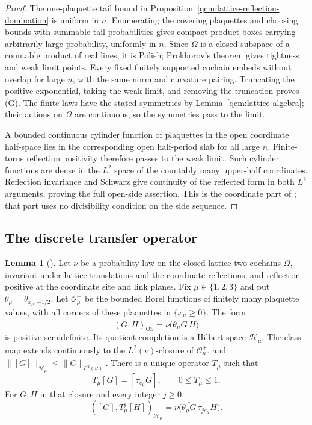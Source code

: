 \documentclass[11pt,letterpaper,reqno]{amsart}
\theoremstyle{definition}
\newtheorem{qcmlemma}[qcmproposition]{Lemma}
\newenvironment{lemma}[1][]{\pushQED{\qed}\renewcommand{\qedsymbol}{$\blacksquare$}\begin{qcmlemma}[#1]}{\popQED\end{qcmlemma}}
\begin{document}
\begin{proof}
The one-plaquette tail bound in
Proposition~\ref{qcm:lattice-reflection-domination} is uniform in
$n$. Enumerating the covering plaquettes and choosing bounds with
summable tail probabilities gives compact product boxes carrying
arbitrarily large probability, uniformly in $n$. Since $\Omega$
is a closed subspace of a countable product of real lines, it is
Polish; Prokhorov's theorem gives tightness and weak limit points.
Every fixed finitely supported cochain embeds without overlap for
large $n$, with the same norm and curvature pairing. Truncating the
positive exponential, taking the weak limit, and removing the
truncation proves (G). The finite laws have the stated symmetries
by Lemma~\ref{qcm:lattice-algebra}; their actions on $\Omega$ are
continuous, so the symmetries pass to the limit.

A bounded continuous cylinder function of plaquettes in the open
coordinate half-space lies in the corresponding open half-period
slab for all large $n$. Finite-torus reflection positivity therefore
passes to the weak limit. Such cylinder functions are dense in the
$L^2$ space of the countably many upper-half coordinates. Reflection
invariance and Schwarz give continuity of the reflected form in
both $L^2$ arguments, proving the full open-side assertion. This is
the coordinate part of
\cite[the proof of Theorem~4.7]{QEDConstruction}; that part uses no
divisibility condition on the side sequence.
\end{proof}

\subsection{The discrete transfer operator}
\begin{lemma}\label{qcm:transfer-contraction}
Let $\nu$ be a probability law on the closed lattice two-cochains
$\Omega$, invariant under lattice translations and the coordinate
reflections, and reflection positive at the coordinate site and link
planes. Fix $\mu\in\{1,2,3\}$ and put
$\theta_\mu=\theta_{x_\mu,-1/2}$. Let $\mathcal O_\mu^+$ be the bounded
Borel functions of finitely many plaquette values, with all corners of
these plaquettes in $\{x_\mu\ge0\}$. The form
\[
 (G,H)_{\mathrm{OS}}=\nu\bigl(\overline{\theta_\mu G}\,H\bigr)
\]
is positive semidefinite. Its quotient completion is a Hilbert space
$\mathcal H_\mu$. The class map extends continuously to the
$L^2(\nu)$-closure of $\mathcal O_\mu^+$, and
$\|[G]\|_{\mathcal H_\mu}\le\|G\|_{L^2(\nu)}$.
There is a unique operator $T_\mu$ such that
\[
 T_\mu[G]=[\tau_{e_\mu}G],\qquad 0\le T_\mu\le1.
\]
For $G,H$ in that closure and every integer $j\ge0$,
\begin{equation}\label{qcm:transfer-correlation}
 ([G],T_\mu^j[H])_{\mathcal H_\mu}
   =\nu\bigl(\overline{\theta_\mu G}\,\tau_{je_\mu}H\bigr).
\end{equation}
\end{lemma}
\end{document}
